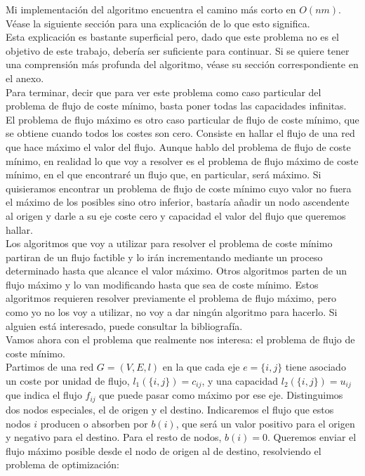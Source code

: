 Mi implementación del algoritmo encuentra el camino más corto en $O(nm)$. Véase la siguiente sección para una explicación de lo que esto significa.\\

Esta explicación es bastante superficial pero, dado que este problema no es el objetivo de este trabajo, debería ser suficiente para continuar.
Si se quiere tener una comprensión más profunda del algoritmo, véase su sección correspondiente en el anexo.\\

Para terminar, decir que para ver este problema como caso particular del problema de flujo de coste mínimo, basta poner todas las capacidades infinitas.\\

El problema de flujo máximo es otro caso particular de flujo de coste mínimo, que se obtiene cuando todos los costes son cero.
Consiste en hallar el flujo de una red que hace máximo el valor del flujo.
Aunque hablo del problema de flujo de coste mínimo, en realidad lo que voy a resolver es el problema de flujo máximo de coste mínimo, en el que encontraré un flujo que, en particular, será máximo.
Si quisieramos encontrar un problema de flujo de coste mínimo cuyo valor no fuera el máximo de los posibles sino otro inferior, bastaría añadir un nodo ascendente al origen y darle a su eje coste cero y capacidad el valor del flujo que queremos hallar.\\

Los algoritmos que voy a utilizar para resolver el problema de coste mínimo partiran de un flujo factible y lo irán incrementando mediante un proceso determinado hasta que alcance el valor máximo.
Otros algoritmos parten de un flujo máximo y lo van modificando hasta que sea de coste mínimo.
Estos algoritmos requieren resolver previamente el problema de flujo máximo, pero como yo no los voy a utilizar, no voy a dar ningún algoritmo para hacerlo.
Si alguien está interesado, puede consultar la bibliografía.\\

Vamos ahora con el problema que realmente nos interesa: el problema de flujo de coste mínimo.\\

Partimos de una red $G=(V,E,l)$ en la que cada eje $e=\{i,j\}$ tiene asociado un coste por unidad de flujo, $l_1(\{i,j\})=c_{ij}$, y una capacidad $l_2(\{i,j\})=u_{ij}$ que indica el flujo $f_{ij}$ que puede pasar como máximo por ese eje.
Distinguimos dos nodos especiales, el de origen y el destino.
Indicaremos el flujo que estos nodos $i$ producen o absorben por $b(i)$, que será un valor positivo para el origen y negativo para el destino.
Para el resto de nodos, $b(i)=0$.
Queremos enviar el flujo máximo posible desde el nodo de origen al de destino, resolviendo el problema de optimización:

